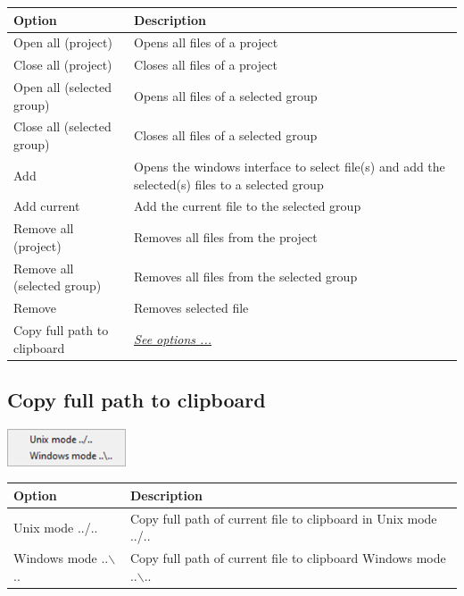 \begin{scriptsize}\begin{tabularx}{\textwidth}{>{\hsize=0.4\hsize}X>{\hsize=0.7\hsize}X}\\
    \hline
    \textbf{Option} & \textbf{Description} \\
    \hline
    Open all (project) & Opens all files of a project \\
    Close all (project) & Closes all files of a project \\
    \hdashline[1pt/1pt]
    Open all (selected group) & Opens all files of a selected group \\
    Close all (selected group) & Closes all files of a selected group \\
    \hdashline[1pt/1pt]
    Add & Opens the windows interface to select file(s) and add the selected(s) files to a selected group \\
    Add current & Add the current file to the selected group \\
    \hdashline[1pt/1pt]
    Remove all (project) & Removes all files from the project \\
    Remove all (selected group) & Removes all files from the selected group \\
    Remove & Removes selected file \\
    \hdashline[1pt/1pt]
    Copy full path to clipboard & \textit{\href{\#menu\_project_file\_copyfullpath}{See options ...}} \\
    \hline
  \end{tabularx}\end{scriptsize}

\hypertarget{menu_project_file_copyfullpath}{}
\subsection{Copy full path to clipboard}

\includegraphics[scale=0.8]{./res/menu_file_copyfullpathtoclipboard.png}\\

\begin{scriptsize}
  \begin{tabularx}{\textwidth}{>{\hsize=0.3\hsize}X>{\hsize=0.8\hsize}X}\\
    \hline
    \textbf{Option} & \textbf{Description} \\
    \hline
    Unix mode ../.. & Copy full path of current file to clipboard in Unix mode ../.. \\
    Windows mode ..$\backslash$.. & Copy full path of current file to clipboard Windows mode ..$\backslash$.. \\
    \hline
  \end{tabularx}
\end{scriptsize}